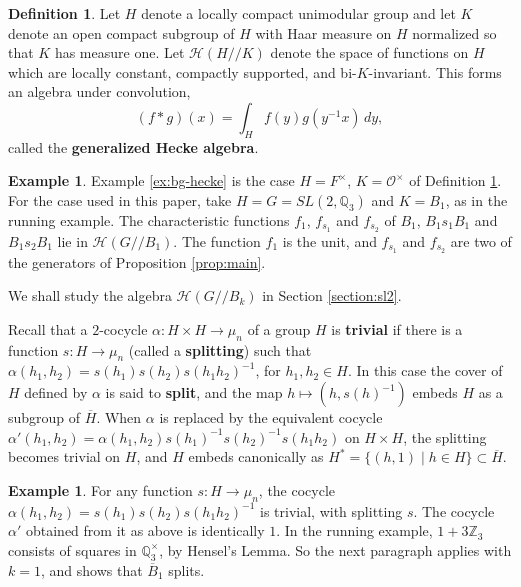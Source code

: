 \documentclass[12pt,letterpaper,reqno]{amsart}
\let\cal\mathcal
\theoremstyle{definition}
\newtheorem{definition}[theorem]{Definition}
\newtheorem{example}[theorem]{Example}
\theoremstyle{remark}
\numberwithin{equation}{section}
\begin{document}
\begin{definition}
\label{def:1}
Let $H$ denote a locally compact unimodular group and let $K$ denote an open
compact subgroup of $H$ with Haar measure on $H$ normalized so that $K$ has
measure one. Let ${\cal H}(H//K)$ denote the space of functions on $H$ which
are locally constant, compactly supported, and bi-$K$-invariant. This forms an
algebra under convolution,
\[
(f*g)(x)=\int_H f(y)g(y^{-1}x)\,dy,
\]
called the \textbf{generalized Hecke algebra}.
\end{definition}

\begin{example}
\label{ex:def1}
Example \ref{ex:bg-hecke} is the case $H=F^\times$, $K={\cal O}^\times$ of
Definition \ref{def:1}. For the case used in this paper, take
$H=G=SL(2,\mathbb{Q}_3)$ and $K=B_1$, as in the running example. The
characteristic functions $f_1$, $f_{s_1}$ and $f_{s_2}$ of $B_1$,
$B_1s_1B_1$ and $B_1s_2B_1$ lie in ${\cal H}(G//B_1)$. The function $f_1$ is
the unit, and $f_{s_1}$ and $f_{s_2}$ are two of the generators of Proposition
\ref{prop:main}.
\end{example}

We shall study the algebra ${\cal H}(G//B_k)$ in Section \ref{section:sl2}.

Recall that a $2$-cocycle $\alpha :H\times H \rightarrow \mu_n$ of a group $H$
is \textbf{trivial} if there is a function $s:H\rightarrow \mu_n$ (called a
\textbf{splitting}) such that $\alpha(h_1,h_2)=s(h_1)s(h_2)s(h_1h_2)^{-1}$,
for $h_1,h_2\in H$. In this case the cover of $H$ defined by $\alpha$ is said
to \textbf{split}, and the map $h \mapsto (h, s(h)^{-1})$ embeds $H$ as a
subgroup of $\overline{H}$. When $\alpha$ is replaced by the equivalent
cocycle $\alpha'(h_1,h_2)=\alpha(h_1,h_2)s(h_1)^{-1}s(h_2)^{-1}s(h_1h_2)$ on
$H\times H$, the splitting becomes trivial on $H$, and $H$ embeds canonically
as $H^*=\{(h,1)\mid h\in H\}\subset \overline{H}$.

\begin{example}
\label{ex:splitting}
For any function $s:H\rightarrow\mu_n$, the cocycle
$\alpha(h_1,h_2)=s(h_1)s(h_2)s(h_1h_2)^{-1}$ is trivial, with splitting $s$.
The cocycle $\alpha'$ obtained from it as above is identically $1$. In the
running example, $1+3\mathbb{Z}_3$ consists of squares in
$\mathbb{Q}_3^\times$, by Hensel's Lemma. So the next paragraph applies with
$k=1$, and shows that $\overline{B}_1$ splits.
\end{example}
\end{document}
